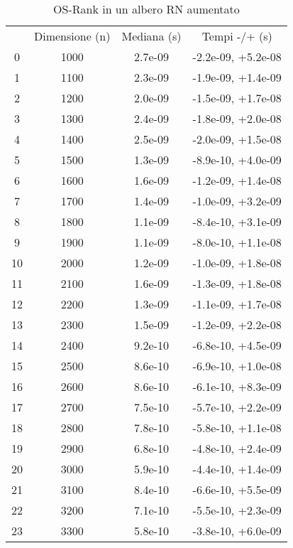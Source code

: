 \begin{table}
\centering
\caption{OS-Rank in un albero RN aumentato}
\label{OS-Rank in un albero RN aumentato}
\begin{adjustbox}{width=1\textwidth/2}
\begin{tabular}{|c|c|c|c|}
\hline
 & Dimensione (n) & Mediana (s) & Tempi -/+ (s) \\
0 & 1000 & 2.7e-09 & -2.2e-09, +5.2e-08 \\
\cline{1-4}
1 & 1100 & 2.3e-09 & -1.9e-09, +1.4e-09 \\
\cline{1-4}
2 & 1200 & 2.0e-09 & -1.5e-09, +1.7e-08 \\
\cline{1-4}
3 & 1300 & 2.4e-09 & -1.8e-09, +2.0e-08 \\
\cline{1-4}
4 & 1400 & 2.5e-09 & -2.0e-09, +1.5e-08 \\
\cline{1-4}
5 & 1500 & 1.3e-09 & -8.9e-10, +4.0e-09 \\
\cline{1-4}
6 & 1600 & 1.6e-09 & -1.2e-09, +1.4e-08 \\
\cline{1-4}
7 & 1700 & 1.4e-09 & -1.0e-09, +3.2e-09 \\
\cline{1-4}
8 & 1800 & 1.1e-09 & -8.4e-10, +3.1e-09 \\
\cline{1-4}
9 & 1900 & 1.1e-09 & -8.0e-10, +1.1e-08 \\
\cline{1-4}
10 & 2000 & 1.2e-09 & -1.0e-09, +1.8e-08 \\
\cline{1-4}
11 & 2100 & 1.6e-09 & -1.3e-09, +1.8e-08 \\
\cline{1-4}
12 & 2200 & 1.3e-09 & -1.1e-09, +1.7e-08 \\
\cline{1-4}
13 & 2300 & 1.5e-09 & -1.2e-09, +2.2e-08 \\
\cline{1-4}
14 & 2400 & 9.2e-10 & -6.8e-10, +4.5e-09 \\
\cline{1-4}
15 & 2500 & 8.6e-10 & -6.9e-10, +1.0e-08 \\
\cline{1-4}
16 & 2600 & 8.6e-10 & -6.1e-10, +8.3e-09 \\
\cline{1-4}
17 & 2700 & 7.5e-10 & -5.7e-10, +2.2e-09 \\
\cline{1-4}
18 & 2800 & 7.8e-10 & -5.8e-10, +1.1e-08 \\
\cline{1-4}
19 & 2900 & 6.8e-10 & -4.8e-10, +2.4e-09 \\
\cline{1-4}
20 & 3000 & 5.9e-10 & -4.4e-10, +1.4e-09 \\
\cline{1-4}
21 & 3100 & 8.4e-10 & -6.6e-10, +5.5e-09 \\
\cline{1-4}
22 & 3200 & 7.1e-10 & -5.5e-10, +2.3e-09 \\
\cline{1-4}
23 & 3300 & 5.8e-10 & -3.8e-10, +6.0e-09 \\

\end{tabular}
\end{adjustbox}
\end{table}
